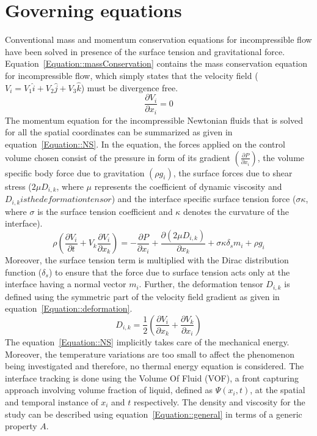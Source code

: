 \section{Governing equations}
Conventional mass and momentum conservation equations for incompressible flow have been solved in presence of the surface tension and gravitational force. Equation~\ref{Equation::massConservation} contains the mass conservation equation for incompressible flow, which simply states that the velocity field ($V_i = V_1\hat{i} + V_2\hat{j} + V_3\hat{k}$) must be divergence free. 
\begin{equation}\label{Equation::massConservation}
\frac{\partial V_i}{\partial x_i} = 0
\end{equation}
The momentum equation for the incompressible Newtonian fluids that is solved for all the spatial coordinates can be summarized as given in equation~\ref{Equation::NS}. In the equation, the forces applied on the control volume chosen consist of the pressure in form of its gradient $\left(\frac{\partial P}{\partial x_i}\right)$, the volume specific body force due to gravitation $\left(\rho g_i\right)$, the surface forces due to shear stress ($2\mu D_{i,k}$, where $\mu$ represents the coefficient of dynamic viscosity and $D_{i,k} is the deformation tensor$) and the interface specific surface tension force ($\sigma \kappa$, where $\sigma$ is the surface tension coefficient and $\kappa$ denotes the curvature of the interface). 
\begin{equation}\label{Equation::NS}
\rho\left(\frac{\partial V_i}{\partial t} + V_k\frac{\partial V_i}{\partial x_k}\right) = -\frac{\partial P}{\partial x_i} + \frac{\partial(2\mu D_{i,k})}{\partial x_k} + \sigma\kappa\delta_sm_i + \rho g_i
\end{equation}
Moreover, the surface tension term is multiplied with the Dirac distribution function ($\delta_s$) to ensure that the force due to surface tension acts only at the interface having a normal vector $m_i$. Further, the deformation tensor $D_{i,k}$ is defined using the symmetric part of the velocity field gradient as given in equation~\ref{Equation::deformation}.
\begin{equation}\label{Equation::deformation}
D_{i,k} = \frac{1}{2}\left(\frac{\partial V_i}{\partial x_k} + \frac{\partial V_k}{\partial x_i}\right)
\end{equation}
The equation~\ref{Equation::NS} implicitly takes care of the mechanical energy. Moreover, the temperature variations are too small to affect the phenomenon being investigated and therefore, no thermal energy equation is considered. The interface tracking is done using the Volume Of Fluid (VOF), a front capturing approach involving volume fraction of liquid, defined as $\Psi(x_i, t)$, at the spatial and temporal instance of $x_i$ and $t$ respectively. The density and viscosity for the study can be described using equation~\ref{Equation::general} in terms of a generic property $A$.
